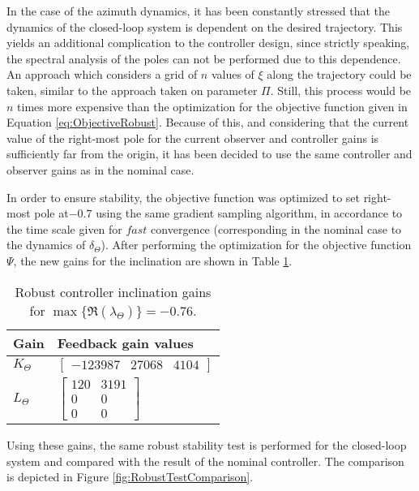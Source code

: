 \documentclass[../main.tex]{subfiles}
\begin{document}
In the case of the azimuth dynamics, it has been constantly stressed that the dynamics of the closed-loop system is dependent on the desired trajectory. This yields an additional complication to the controller design, since strictly speaking, the spectral analysis of the poles can not be performed due to this dependence. An approach which considers a grid of $n$ values of $\xi$ along the trajectory could be taken, similar to the approach taken on parameter $\Pi$. Still, this process would be $n$ times more expensive than the optimization for the objective function given in Equation \eqref{eq:ObjectiveRobust}. Because of this, and considering that the current value of the right-most pole for the current observer and controller gains is sufficiently far from the origin, it has been decided to use the same controller and observer gains as in the nominal case.  

In order to ensure stability, the objective function was optimized to set right-most pole at$-0.7$ using the same gradient sampling algorithm, in accordance to the time scale given for $fast$ convergence (corresponding in the nominal case to the dynamics of $\delta_\Theta$). After performing the optimization for the objective function $\Psi$, the new gains for the inclination are shown in Table \ref{table:controllervaluesrobust}.

\begin{table}[h]
	\centering
	\caption{Robust controller inclination gains for $ \max\{\Re(\lambda_{\Theta})\} = -0.76$.}
	\label{table:controllervaluesrobust}
	\begin{tabular}{|l|l|}
		\hline
		Gain & Feedback gain values \\ \hline
		$K_\Theta$ & $\begin{bmatrix} -123987 & 27068 & 4104 \end{bmatrix}$\\ \hline
		$L_\Theta$ & $\begin{bmatrix} 120 & 3191 \\ 0 & 0 \\ 0 & 0\end{bmatrix}$ \\ \hline
	\end{tabular}
\end{table}


Using these gains, the same robust stability test is performed for the closed-loop system and compared with the result of the nominal controller. The comparison is depicted in Figure \ref{fig:RobustTestComparison}.
\end{document}
